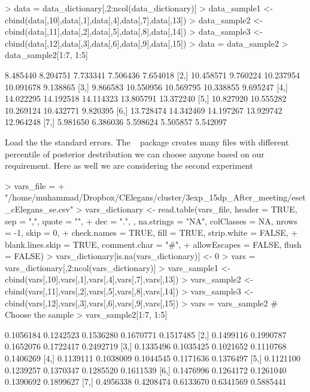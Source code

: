 \documentclass{article}
\begin{document}
\begin{Schunk}
\begin{Sinput}
> data = data_dictionary[,2:ncol(data_dictionary)]
> data_sample1 <- cbind(data[,10],data[,1],data[,4],data[,7],data[,13])
> data_sample2 <- cbind(data[,11],data[,2],data[,5],data[,8],data[,14])
> data_sample3 <- cbind(data[,12],data[,3],data[,6],data[,9],data[,15])
> data = data_sample2
> data_sample2[1:7, 1:5]
\end{Sinput}
\begin{Soutput}
          [,1]      [,2]      [,3]      [,4]      [,5]
[1,]  8.485440  8.204751  7.733341  7.506436  7.654018
[2,] 10.458571  9.760224 10.237954 10.091678  9.138865
[3,]  9.866583 10.550956 10.569795 10.338855  9.695247
[4,] 14.022295 14.192518 14.114323 13.805791 13.372240
[5,] 10.827920 10.555282 10.269124 10.432771  9.820395
[6,] 13.728474 14.342469 14.197267 13.929742 12.964248
[7,]  5.981650  6.386036  5.598624  5.505857  5.542097
\end{Soutput}
\end{Schunk}

Load the the standard errors. The ~\cite{puma} package creates many files with different percentile of posterior destribution we can choose anyone based on our requirement. Here as well we are considering the second experiment

\begin{Schunk}
\begin{Sinput}
> vars_file = 
+   "/home/muhammad/Dropbox/CElegans/cluster/3exp_15dp_After_meeting/eset_cElegans_se.csv"
> vars_dictionary <- read.table(vars_file, header = TRUE, sep = ",", quote = "", 
+                   dec = ".", , na.strings = "NA", colClasses = NA, nrows = -1, skip = 0, 
+                   check.names = TRUE, fill = TRUE, strip.white = FALSE, 
+                   blank.lines.skip = TRUE, comment.char = "#", 
+                   allowEscapes = FALSE, flush = FALSE)
> vars_dictionary[is.na(vars_dictionary)] <- 0
> vars = vars_dictionary[,2:ncol(vars_dictionary)]
> vars_sample1 <- cbind(vars[,10],vars[,1],vars[,4],vars[,7],vars[,13])
> vars_sample2 <- cbind(vars[,11],vars[,2],vars[,5],vars[,8],vars[,14])
> vars_sample3 <- cbind(vars[,12],vars[,3],vars[,6],vars[,9],vars[,15])
> vars = vars_sample2 # Choose the sample
> vars_sample2[1:7, 1:5]
\end{Sinput}
\begin{Soutput}
          [,1]      [,2]      [,3]      [,4]      [,5]
[1,] 0.1056184 0.1242523 0.1536280 0.1670771 0.1517485
[2,] 0.1499116 0.1990787 0.1652076 0.1722417 0.2492719
[3,] 0.1335496 0.1035425 0.1021652 0.1110768 0.1406269
[4,] 0.1139111 0.1038009 0.1044545 0.1171636 0.1376497
[5,] 0.1121100 0.1239257 0.1370347 0.1285520 0.1611539
[6,] 0.1476996 0.1264172 0.1261040 0.1390692 0.1899627
[7,] 0.4956338 0.4208474 0.6133670 0.6341569 0.5885441
\end{Soutput}
\end{Schunk}
\end{document}
